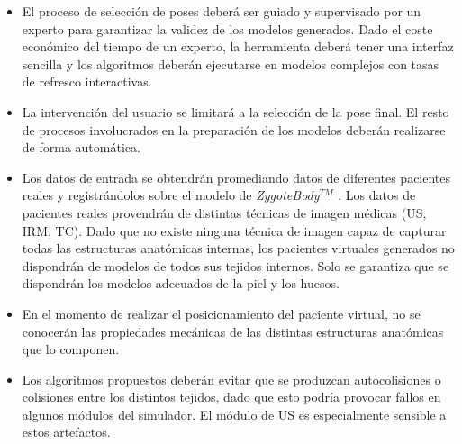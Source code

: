 \begin{itemize}
    \item El proceso de selección de poses deberá ser guiado y supervisado por un experto para garantizar la validez de los modelos generados. Dado el coste económico del tiempo de un experto, la herramienta deberá tener una interfaz sencilla y los algoritmos deberán ejecutarse en modelos complejos con tasas de refresco interactivas.
    \item La intervención del usuario se limitará a la selección de la pose final. El resto de procesos involucrados en la preparación de los modelos deberán realizarse de forma automática.
    \item Los datos de entrada se obtendrán promediando datos de diferentes pacientes reales y registrándolos sobre el modelo de \emph{ZygoteBody}$^{TM}$ \cite{kelc2012zygote}. Los datos de pacientes reales provendrán de distintas técnicas de imagen médicas (\ac{US}, \ac{IRM}, \ac{TC}). Dado que no existe ninguna técnica de imagen capaz de capturar todas las estructuras anatómicas internas, los pacientes virtuales generados no dispondrán de modelos de todos sus tejidos internos. Solo se garantiza que se dispondrán los modelos adecuados de la piel y los huesos. 
    \item En el momento de realizar el posicionamiento del paciente virtual, no se conocerán las propiedades mecánicas de las distintas estructuras anatómicas que lo componen.
    \item Los algoritmos propuestos deberán evitar que se produzcan autocolisiones o colisiones entre los distintos tejidos, dado que esto podría provocar fallos en  algunos módulos del simulador. El módulo de \ac{US} es especialmente sensible a estos artefactos.

\end{itemize}
